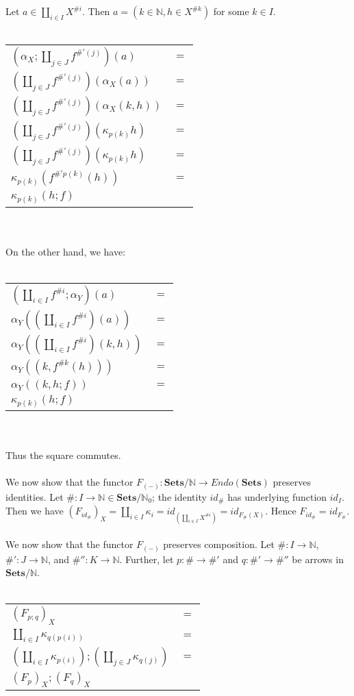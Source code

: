 \documentclass{article}
\newcommand{\mbf}{\mathbf}
\begin{document}
Let $a \in \coprod_{i \in I} X^{\# i}$. Then $a = (k \in \mathbb N, h \in X^{\# k})$ for some $k \in I$. 
\\~\\
\begin{tabular}{ll}
$(\alpha_X;\coprod_{j \in J} f^{\#'(j)})(a)$ & $=$ \\
$(\coprod_{j \in J} f^{\#'(j)})(\alpha_X(a))$ & $=$ \\
$(\coprod_{j \in J} f^{\#'(j)})(\alpha_X(k,h))$ & $=$ \\
$(\coprod_{j \in J} f^{\#'(j)})(\kappa_{p(k)} h)$ & $=$ \\
$(\coprod_{j \in J} f^{\#'(j)})(\kappa_{p(k)} h)$ & $=$ \\
$\kappa_{p(k)} (f^{\#'p(k)}(h))$ & $=$ \\
$\kappa_{p(k)}(h;f)$
\end{tabular}\\~\\
On the other hand, we have:\\~\\
\begin{tabular}{ll}
$(\coprod_{i \in I} f^{\#i}; \alpha_Y)(a)$ & $=$ \\
$\alpha_Y((\coprod_{i \in I} f^{\#i})(a))$ & $=$ \\
$\alpha_Y((\coprod_{i \in I} f^{\#i})(k,h))$ & $=$ \\
$\alpha_Y((k,f^{\#k}(h)))$ & $=$ \\
$\alpha_Y((k,h;f))$ & $=$ \\
$\kappa_{p(k)} (h;f)$
\end{tabular}\\~\\
Thus the square commutes. \\~\\
We now show that the functor $F_{(-)} : \mbf{Sets}/\mathbb N \to \mathit{Endo}(\mbf{Sets})$ preserves
identities. Let $\# : I \to \mathbb N \in \mbf{Sets}/\mathbb N_0$; the identity $\mathit{id}_{\#}$ has underlying function
$\mathit{id}_{I}$. Then we have $(F_{\mathit{id}_{\#}})_X = \coprod_{i \in I} \kappa_i = id_{(\coprod_{i \in I} X^{\# i})} = id_{F_{\#}(X)}$. 
Hence $F_{\mathit{id}_{\#}} = \mathit{id}_{F_\#}$.\\~\\
We now show that the functor $F_{(-)}$ preserves composition. Let $\# : I \to \mathbb N$, $\#' : J \to \mathbb N$, and
$\#'' : K \to \mathbb N$. Further, let $p : \# \to \#'$ and $q : \#' \to \#''$ be arrows in $\mbf{Sets}/\mathbb N$.\\~\\
\begin{tabular}{ll}
$(F_{p;q})_X$ & $=$ \\
$\coprod_{i \in I} \kappa_{q(p(i))}$ & $=$ \\
$(\coprod_{i \in I} \kappa_{p(i)});(\coprod_{j \in J} \kappa_{q(j)})$ & $=$ \\
$(F_{p})_X;(F_q)_X$
\end{tabular}
\end{document}
